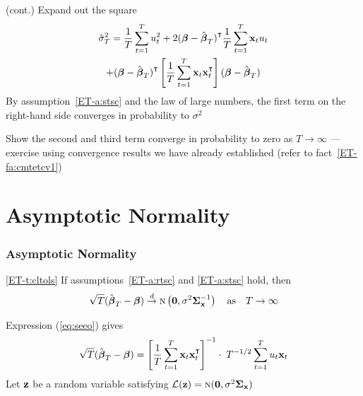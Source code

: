 \begin{frame}

    \vspace{2em}
    \Prf (cont.) Expand out the square
    \begin{multline*}
        \hat \sigma_T^2 
        = \frac{1}{T} \sum_{t=1}^T u_t^2
        + 2 (\boldbeta - \hboldbeta_T)^\T \frac{1}{T} \sum_{t=1}^T \boldx_t u_t 
        \\ + (\boldbeta - \hboldbeta_T)^\T 
            \left[ \frac{1}{T} \sum_{t=1}^T \boldx_t \boldx_t^\T \right]
         (\boldbeta - \hboldbeta_T) 
    \end{multline*}
    By assumption~\ref{ET-a:stsc} and the law of large numbers, the first term on
    the right-hand side converges in probability to $\sigma^2$ 

    \vspace{.7em}
    Show the second and third term converge in probability
    to zero as $T \to \infty$ --- exercise using convergence results we have already established (refer to fact~\ref{ET-fa:cmtetcv1})
    
\end{frame}

\section{Asymptotic Normality}

\begin{frame}\frametitle{Asymptotic Normality}
    
    \vspace{2em}
    \Thm\eqref{ET-t:cltols}
        If assumptions~\ref{ET-a:rtsc} and \ref{ET-a:stsc} hold, then
        \begin{equation*}
            \sqrt{T} (\hat {\boldsymbol \beta}_T - {\boldsymbol \beta}) \stackrel { d } {\to} 
            \textrm{\sc n} \left({\mathbf 0}, \sigma^2 {\boldsymbol \Sigma_{{\mathbf x}}^{-1}} \right)
            \quad \text{as} \quad T \to \infty
        \end{equation*}
    
    \Prf 
    Expression (\ref{eq:seeo}) gives
    \begin{equation*}
        \label{eq:seeo2}
        \sqrt{T}(\hboldbeta_T - \boldbeta)
        = \left[ \frac{1}{T} \sum_{t=1}^T \boldx_t \boldx_t^\T \right]^{-1} 
        \cdot \; T^{-1/2} \sum_{t=1}^T u_t \boldx_t
    \end{equation*}
    Let ${\mathbf z}$ be a random variable satisfying $\mathcal L({\mathbf z}) = \textrm{\sc n}({\mathbf 0},
    \sigma^2 {\boldsymbol \Sigma_{{\mathbf x}}})$
    
\end{frame}

